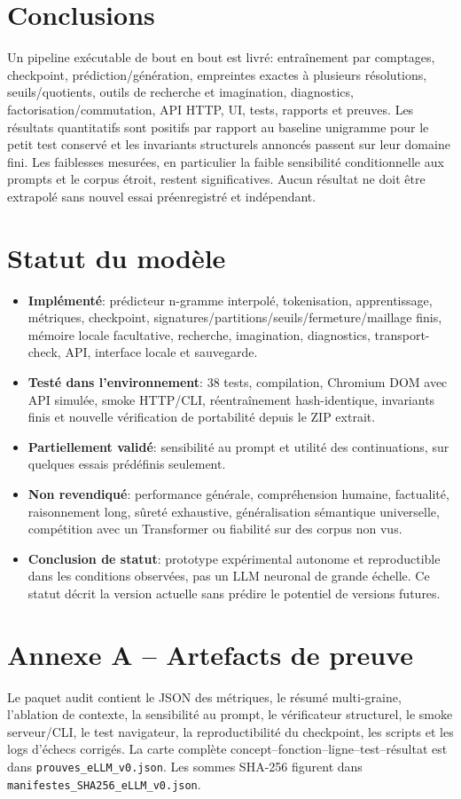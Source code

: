 \documentclass[11pt,a4paper]{article}
\begin{document}
\section{Conclusions}
Un pipeline exécutable de bout en bout est livré: entraînement par comptages, checkpoint, prédiction/génération, empreintes exactes à plusieurs résolutions, seuils/quotients, outils de recherche et imagination, diagnostics, factorisation/commutation, API HTTP, UI, tests, rapports et preuves. Les résultats quantitatifs sont positifs par rapport au baseline unigramme pour le petit test conservé et les invariants structurels annoncés passent sur leur domaine fini. Les faiblesses mesurées, en particulier la faible sensibilité conditionnelle aux prompts et le corpus étroit, restent significatives. Aucun résultat ne doit être extrapolé sans nouvel essai préenregistré et indépendant.
\section{Statut du modèle}
\begin{itemize}[leftmargin=*]
\item \textbf{Implémenté}: prédicteur n-gramme interpolé, tokenisation, apprentissage, métriques, checkpoint, signatures/partitions/seuils/fermeture/maillage finis, mémoire locale facultative, recherche, imagination, diagnostics, transport-check, API, interface locale et sauvegarde.
\item \textbf{Testé dans l'environnement}: 38 tests, compilation, Chromium DOM avec API simulée, smoke HTTP/CLI, réentraînement hash-identique, invariants finis et nouvelle vérification de portabilité depuis le ZIP extrait.
\item \textbf{Partiellement validé}: sensibilité au prompt et utilité des continuations, sur quelques essais prédéfinis seulement.
\item \textbf{Non revendiqué}: performance générale, compréhension humaine, factualité, raisonnement long, sûreté exhaustive, généralisation sémantique universelle, compétition avec un Transformer ou fiabilité sur des corpus non vus.
\item \textbf{Conclusion de statut}: prototype expérimental autonome et reproductible dans les conditions observées, pas un LLM neuronal de grande échelle. Ce statut décrit la version actuelle sans prédire le potentiel de versions futures.
\end{itemize}
\section*{Annexe A -- Artefacts de preuve}
Le paquet audit contient le JSON des métriques, le résumé multi-graine, l'ablation de contexte, la sensibilité au prompt, le vérificateur structurel, le smoke serveur/CLI, le test navigateur, la reproductibilité du checkpoint, les scripts et les logs d'échecs corrigés. La carte complète concept--fonction--ligne--test--résultat est dans \texttt{prouves\_eLLM\_v0.json}. Les sommes SHA-256 figurent dans \texttt{manifestes\_SHA256\_eLLM\_v0.json}.
\end{document}
